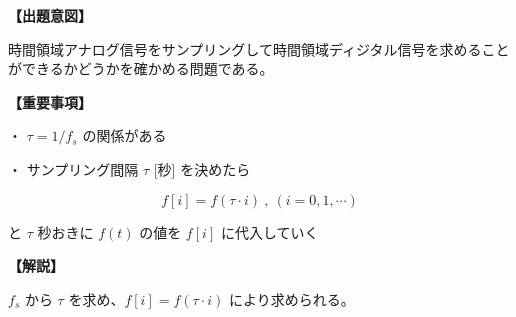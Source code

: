 \noindent \textbf{【出題意図】}

\noindent 時間領域アナログ信号をサンプリングして時間領域ディジタル信号を求めることができるかどうかを確かめる問題である。

\vspace{1em}
\noindent \textbf{【重要事項】}

\medskip
\noindent ・ $\tau = 1/f_s$ の関係がある

\medskip
\noindent ・ サンプリング間隔 $\tau$ [秒] を決めたら

\[
f[i] = f( \tau \cdot i ) \ , \ (i=0,1,\cdots)
\]

\noindent と $\tau$ 秒おきに $f(t)$ の値を $f[i]$ に代入していく

\vspace{1em}
\noindent \textbf{【解説】}

\noindent $f_s$ から $\tau$ を求め、$f[i] = f( \tau \cdot i )$ により求められる。
